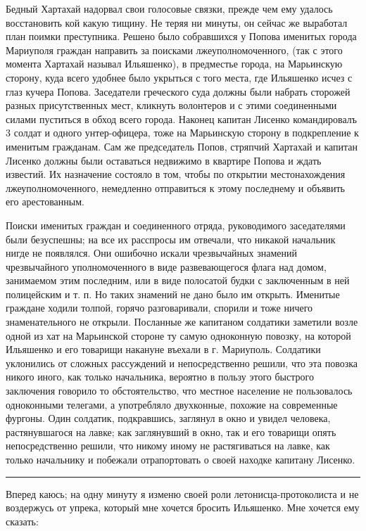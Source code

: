 \documentclass[a4paper,20pt]{article}
\begin{document}
Бедный Хартахай надорвал свои голосовые связки, прежде чем ему удалось
восстановить кой какую тищину. Не теряя ни минуты, он сейчас же выработал план
поимки преступника. Решено было собравшихся у Попова именитых города Мариуполя
граждан направить за поисками лжеуполномоченного, (так с этого момента Хартахай
называл Ильяшенко), в предместье города, на Марьинскую сторону, куда всего
удобнее было укрыться с того места, где Ильяшенко исчез с глаз кучера Попова.
Заседатели греческого суда должны были набрать сторожей разных присутственных
мест, кликнуть волонтеров и с этими соединенными силами пуститься в обход всего
города. Наконец капитан Лисенко командировалъ 3 солдат и одного унтер-офицера,
тоже на Марьинскую сторону в подкрепление к именитым гражданам. Сам же
председатель Попов, стряпчий Хартахай и капитан Лисенко должны были оставаться
недвижимо в квартире Попова и ждать известий. Их назначение состояло в том,
чтобы по открытии местонахождения лжеуполномоченного, немедленно отправиться к
этому последнему и объявить его арестованным.

Поиски именитых граждан и соединенного отряда, руководимого заседателями были безуспешны;
на все их расспросы им отвечали, что никакой начальник нигде не появлялся. Они ошибочно искали
чрезвычайных знамений чрезвычайного уполномоченного в виде развевающегося флага
над домом, занимаемом этим последним, или в виде полосатой будки с заключенным в ней полицейским и т. п.
Но таких знамений не дано было им открыть. Именитые граждане ходили толпой, 
горячо разговаривали, спорили и тоже ничего знаменательного не открыли. Посланные
же капитаном солдатики заметили возле одной из хат
на Марьинской стороне ту самую одноконную повозку, на
которой Ильяшенко и его товарищи накануне въехали в
г. Мариуполь. Солдатики уклонились от сложных рассуждений
и непосредственно решили, что эта повозка никого
иного, как только начальника, вероятно в пользу этого
быстрого заключения говорило то обстоятельство, что местное
население не пользовалось одноконными телегами, а употребляло двухконные, 
похожие на современные фургоны. Один
солдатик, подкравшись, заглянул в окно и увидел человека, 
растянувшагося на лавке; как заглянувший в окно,
так и его товарищи опять непосредственно решили, что
никому иному не растягиваться на лавке, как только начальнику и 
побежали отрапортовать о своей находке капитану Лисенко.

\par\noindent\rule{\textwidth}{0.4pt}

Вперед каюсь; на одну минуту я изменю своей роли
летонисца-протоколиста и не воздержусь от упрека, который
мне хочется бросить Ильяшенко. Мне хочется ему сказать:
\end{document}
